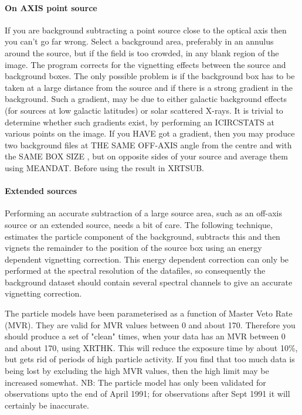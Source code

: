 \documentclass{book}
\renewcommand{\_}{{\tt\char'137}}     %
\begin{document}
\paragraph{On AXIS point source}
If you are background subtracting a point source close to the optical
axis then you can't go far wrong. Select a background area,
preferably in an annulus around the source, but if the field is too
crowded, in any blank region of the image. The program corrects for
the vignetting effects between the source and background boxes. The
only possible problem is if the background box has to be taken at a
large distance from the source and if there is a strong gradient in
the background. Such a gradient, may be due to either galactic
background effects (for sources at low galactic latitudes) or solar
scattered X-rays. It is trivial to determine whether
such gradients exist, by performing an ICIRCSTATS at various points
on the image. If you HAVE got a gradient, then you may produce two
background files at THE SAME OFF-AXIS angle from the centre and with
the SAME BOX SIZE , but on opposite sides of your source and average
them using MEANDAT. Before using the result in XRTSUB.
 
\paragraph{Extended sources}
Performing an accurate subtraction of a large source area, such as an
off-axis source or an extended source, needs a bit of care.
The following technique, estimates the particle component of the
background, subtracts this and then vignets the remainder to the
position of the source box using an energy dependent vignetting
correction. This energy dependent correction can only be performed
at the spectral resolution of the datafiles, so consequently the
background dataset should contain several spectral channels to give
an accurate vignetting correction.
 
The particle models have been parameterised as a function of Master
Veto Rate (MVR). They are valid for MVR values between 0 and about
170. Therefore you should produce a set of "clean" times, when your
data has an MVR between 0 and about 170, using XRTHK. This will reduce
the exposure time by about 10\%, but gets rid of periods of high
particle activity. If you find that too much data is being lost by
excluding the high MVR values, then the high limit may be increased
somewhat. NB: The particle model has only been validated for
observations upto the end of April 1991; for observations after
Sept 1991 it will certainly be inaccurate.
 
\end{document}
